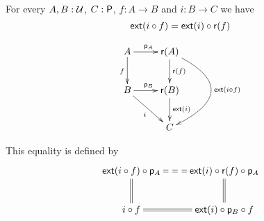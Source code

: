 



\begin{defn}
  For every $A,B:\type$, $C:\P$, $f:A\to{}B$ and $i:B\to{}C$ we have
  \[\ext(i\circ{}f)=\ext(i)\circ\reflect(f)\]

  \[\xymatrix{
    A \ar^{\project_A}[r] \ar_f[d] & \reflect(A) \ar^{\reflect(f)}[d]
    \ar@/^15mm/^{\ext(i\circ f)}[dd] \\
    B \ar^{\project_B}[r] \ar_i[rd] & \reflect(B) \ar^{\ext(i)}[d] \\
    & C}\]

  This equality is defined by
  \[\xymatrix{
    \ext(i\circ f)\circ\project_A \ar@{==}[r] \ar@{=}[d] &
    \ext(i)\circ\reflect(f)\circ\project_A \ar@{=}[d] \\
    i\circ f \ar@{=}[r] & \ext(i)\circ\project_B\circ f
  }\]

\end{defn}




